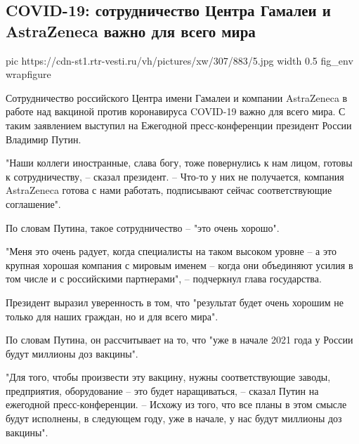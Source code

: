  
 
 
 
 
 
\subsection{COVID-19: сотрудничество Центра Гамалеи и AstraZeneca важно для всего мира}
\label{sec:17_12_2020.news.ru.vesti.1.covid_russia_astrazeneca}


\ifcmt
  pic https://cdn-st1.rtr-vesti.ru/vh/pictures/xw/307/883/5.jpg
  width 0.5
  fig_env wrapfigure
\fi

Сотрудничество российского Центра имени Гамалеи и компании AstraZeneca в работе
над вакциной против коронавируса COVID-19 важно для всего мира. С таким
заявлением выступил на Ежегодной пресс-конференции президент России Владимир
Путин.

"Наши коллеги иностранные, слава богу, тоже повернулись к нам лицом, готовы к
сотрудничеству, – сказал президент. – Что-то у них не получается, компания
AstraZeneca готова с нами работать, подписывают сейчас соответствующие
соглашение".

По словам Путина, такое сотрудничество – "это очень хорошо".

"Меня это очень радует, когда специалисты на таком высоком уровне – а это
крупная хорошая компания с мировым именем – когда они объединяют усилия в том
числе и с российскими партнерами", – подчеркнул глава государства.

Президент выразил уверенность в том, что "результат будет очень хорошим не
только для наших граждан, но и для всего мира".

По словам Путина, он рассчитывает на то, что "уже в начале 2021 года у России
будут миллионы доз вакцины".

"Для того, чтобы произвести эту вакцину, нужны соответствующие заводы,
предприятия, оборудование – это будет наращиваться, – сказал Путин на ежегодной
пресс-конференции. – Исхожу из того, что все планы в этом смысле будут
исполнены, в следующем году, уже в начале, у нас будут миллионы доз вакцины".

